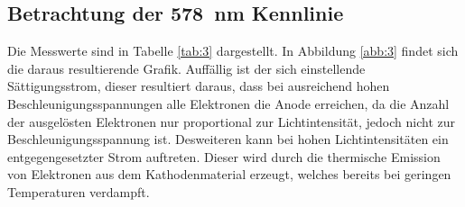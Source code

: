 \subsection{Betrachtung der \SI{578}{\nano\metre} Kennlinie}
Die Messwerte sind in Tabelle \ref{tab:3} dargestellt. In Abbildung \ref{abb:3}
findet sich die daraus resultierende Grafik. Auffällig ist der sich einstellende
Sättigungsstrom, dieser resultiert daraus, dass bei ausreichend hohen Beschleunigungsspannungen
alle Elektronen die Anode erreichen, da die Anzahl der ausgelösten Elektronen nur proportional
zur Lichtintensität, jedoch nicht zur Beschleunigungsspannung ist. Desweiteren kann bei hohen
Lichtintensitäten ein entgegengesetzter Strom auftreten. Dieser wird durch die thermische
Emission von Elektronen aus dem Kathodenmaterial erzeugt, welches bereits bei geringen
Temperaturen verdampft.
